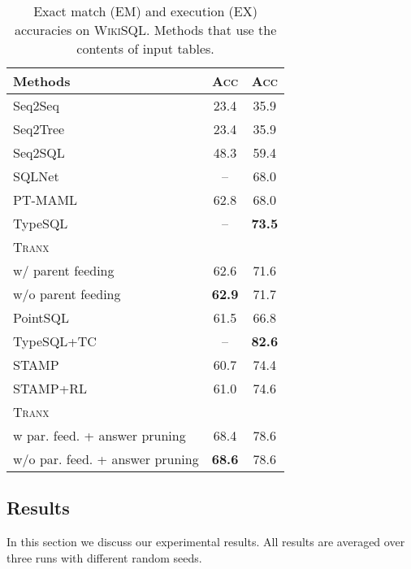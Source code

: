 \documentclass[11pt,a4paper]{article}
\def\model/{\textsc{Tranx}}
\def\wikisql/{\textsc{WikiSQL}}
\def\sq/{{\sc Seq2Tree}}
\begin{document}
\begin{table}[t]
\small
  \centering
  \begin{tabular}{lcc}
  \hline

  \hline
  \textbf{Methods} & \textsc{Acc} & \textsc{Acc} \\
  \hline
    Seq2Seq \citep{DBLP:journals/corr/abs-1709-00103} & 23.4 & 35.9 \\
    \sq/ \citep{DBLP:conf/acl/DongL16} & 23.4 & 35.9 \\
    Seq2SQL \citep{DBLP:journals/corr/abs-1709-00103} & 48.3 & 59.4 \\
    SQLNet \citep{xu2017sqlnet} & -- & 68.0 \\
    PT-MAML \citep{huang2018sqlmeta} & 62.8 & 68.0 \\
    TypeSQL \citep{yu18typesql} & -- & {\bf 73.5} \\
  \hline
    \model/ \\
    \quad w/ parent feeding & 62.6 & 71.6 \\
    \quad w/o parent feeding & {\bf 62.9} & 71.7 \\
  \hline

  \hline
    PointSQL \citep{wang17pointsql} & 61.5 & 66.8 \\
    TypeSQL+TC \citep{yu18typesql} & -- & {\bf 82.6} \\
    STAMP \citep{sun18sql} & 60.7 & 74.4 \\
    STAMP+RL \citep{sun18sql} & 61.0 & 74.6 \\
  \hline
    \model/ \\
    \quad w par. feed. + answer pruning & 68.4 & 78.6 \\
    \quad w/o par. feed. + answer pruning  & {\bf 68.6} & 78.6 \\
  \hline

  \hline
  \end{tabular}
  \caption{Exact match (EM) and execution (EX) accuracies on \wikisql/. Methods that use the contents of input tables. }
  \label{tab:exp:resuts:wiki}
  \vspace{-4mm}
\end{table}

\vspace{-1mm}
\subsection{Results}
\vspace{-1mm}

In this section we discuss our experimental results.
All results are averaged over three runs with different random seeds.
\end{document}
